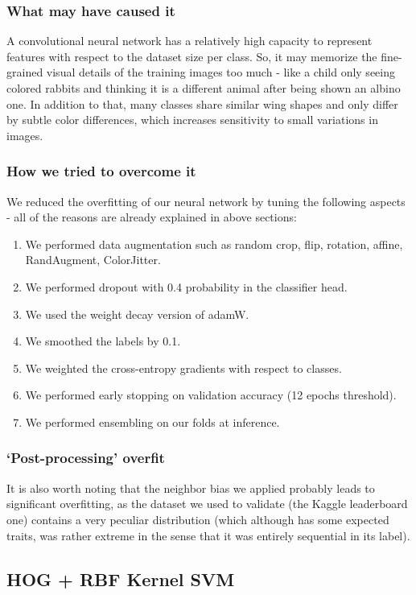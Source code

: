 \documentclass[10pt]{article} %
\begin{document}
\subsubsection{What may have caused it}
A convolutional neural network has a relatively high capacity to represent features with respect to the dataset size per class. So, it may memorize the fine-grained visual details of the training images too much - like a child only seeing colored rabbits and thinking it is a different animal after being shown an albino one. In addition to that, many classes share similar wing shapes and only differ by subtle color differences, which increases sensitivity to small variations in images.

\subsubsection{How we tried to overcome it}
We reduced the overfitting of our neural network by tuning the following aspects - all of the reasons are already explained in above sections:\begin{enumerate}
    \item We performed data augmentation such as random crop, flip, rotation, affine, RandAugment, ColorJitter.
    \item We performed dropout with 0.4 probability in the classifier head.
    \item We used the weight decay version of adamW.
    \item We smoothed the labels by 0.1.
    \item We weighted the cross-entropy gradients with respect to classes.
    \item We performed early stopping on validation accuracy (12 epochs threshold).
    \item We performed ensembling on our folds at inference.
\end{enumerate}
\subsubsection{`Post-processing' overfit}
It is also worth noting that the neighbor bias we applied probably leads to significant overfitting, as the dataset we used to validate (the Kaggle leaderboard one) contains a very peculiar distribution (which although has some expected traits, was rather extreme in the sense that it was entirely sequential in its label).
\subsection{HOG + RBF Kernel SVM}
\end{document}
